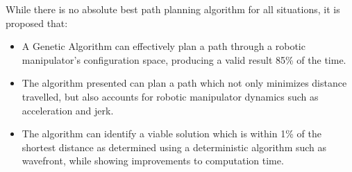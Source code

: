 While there is no absolute best path planning algorithm for all situations, it is proposed that:

\begin{itemize}
	\item A Genetic Algorithm can effectively plan a path through a robotic manipulator's configuration space, producing a valid result 85\% of the time.
	\item The algorithm presented can plan a path which not only minimizes distance travelled, but also accounts for robotic manipulator dynamics such as acceleration and jerk.
	\item The algorithm can identify a viable solution which is within 1\% of the shortest distance as determined using a deterministic algorithm such as wavefront, while showing improvements to computation time.
\end{itemize}
